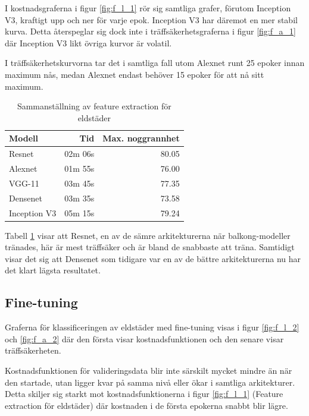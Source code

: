 \documentclass[]{kththesis}
\begin{document}
I kostnadsgraferna i figur \ref{fig:f_l_1} rör sig samtliga grafer, förutom Inception V3, kraftigt upp och ner för varje epok.
Inception V3 har däremot en mer stabil kurva. 
Detta återspeglar sig dock inte i träffsäkerhetsgraferna i figur \ref{fig:f_a_1} där Inception V3 likt övriga kurvor är volatil.

I träffsäkerhetskurvorna tar det i samtliga fall utom Alexnet runt 25 epoker innan maximum nås, medan Alexnet endast behöver 15 epoker för att nå sitt maximum.


\begin{table}[!htbp]
  \centering
  \begin{tabular}{|l|r|r|}
    Modell & Tid & Max. noggrannhet \\ 
    \hline
    Resnet       & 02m 06s & 80.05 \\
    Alexnet      & 01m 55s & 76.00 \\
    VGG-11       & 03m 45s & 77.35 \\
    Densenet     & 03m 35s & 73.58 \\
    Inception V3 & 05m 15s & 79.24 \\
  \end{tabular}
  \caption{Sammanställning av feature extraction för eldstäder}
  \label{fig:sam_3}
\end{table}


Tabell \ref{fig:sam_3} visar att Resnet, en av de sämre arkitekturerna när balkong-modeller tränades, här är mest träffsäker och är bland de snabbaste att träna. Samtidigt visar det sig att Densenet som tidigare var en av de bättre arkitekturerna nu har det klart lägsta resultatet.

\subsection{Fine-tuning}
Graferna för klassificeringen av eldstäder med fine-tuning visas i figur \ref{fig:f_l_2} och \ref{fig:f_a_2} där den första visar kostnadsfunktionen och den senare visar träffsäkerheten.

Kostnadsfunktionen för valideringsdata blir inte särskilt mycket mindre än när den startade, utan ligger kvar på samma nivå eller ökar i samtliga arkitekturer.
Detta skiljer sig starkt mot kostnadsfunktionerna i figur \ref{fig:f_l_1} (Feature extraction för eldstäder) där kostnaden i de första epokerna snabbt blir lägre. 
\end{document}
